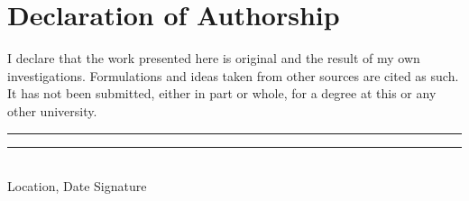 \chapter{Declaration of Authorship}
\thispagestyle{empty}

\noindent%
I declare that the work presented here is original and the result of my own investigations. Formulations and ideas taken from other sources are cited as such. It has not been submitted, either in part or whole, for a degree at this or any other university.

\vfill
\noindent%
\rule[1em]{8em}{0.5pt}  \hfill \rule[1em]{8em}{0.5pt}\\ %
Location, Date \hfill Signature\\
\cleardoublepage
